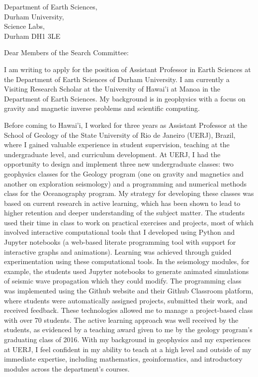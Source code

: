 \documentclass[11pt]{letter}
\begin{document}
\begin{letter}{
        Department of Earth Sciences,  \\
        Durham University, \\
        Science Labs, \\
        Durham DH1 3LE
}
\opening{Dear Members of the Search Committee:}

I am writing to apply for the position of
Assistant Professor in Earth Sciences
at the Department of Earth Sciences of Durham University.
I am currently a Visiting Research Scholar at the University of Hawai'i at Manoa in the
Department of Earth Sciences.
My background is in geophysics with a focus on gravity and magnetic inverse problems and
scientific computing.

Before coming to Hawai'i, I worked for three years as Assistant Professor at the School
of Geology of the State University of Rio de Janeiro (UERJ), Brazil, where I gained
valuable experience in student supervision, teaching at the undergraduate level, and
curriculum development.
At UERJ, I had the opportunity to design and implement three new undergraduate classes:
two geophysics classes for the Geology program
(one on gravity and magnetics and another on exploration seismology)
and a programming and numerical methods class for the Oceanography program.
My strategy for developing these classes was based on current research in active
learning, which has been shown to lead to higher retention and deeper understanding of
the subject matter.
The students used their time in class to work on practical exercises and projects, most
of which involved interactive computational tools that I developed using Python and
Jupyter notebooks (a web-based literate programming tool with support for interactive
graphs and animations).
Learning was achieved through guided experimentation using these computational tools.
In the seismology modules, for example, the students used Jupyter notebooks to generate
animated simulations of seismic wave propagation which they could modify.
The programming class was implemented using the Github website and their Github
Classroom platform, where students were automatically assigned projects, submitted their
work, and received feedback.
These technologies allowed me to manage a project-based class with over 70 students.
The active learning approach was well received by the students, as evidenced by a
teaching award given to me by the geology program's graduating class of 2016.
With my background in geophysics and my experiences at UERJ, I feel confident in my
ability to teach at a high level and outside of my immediate expertise, including
mathematics, geoinformatics, and introductory modules across the department's courses.


\end{letter}
\end{document}
